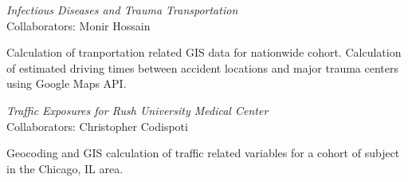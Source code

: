 \documentclass[margin,line]{res}
\newenvironment{list1}{
  \begin{list}{\ding{113}}{%
      \setlength{\itemsep}{0in}
      \setlength{\parsep}{0in} \setlength{\parskip}{0in}
      \setlength{\topsep}{0in} \setlength{\partopsep}{0in} 
      \setlength{\leftmargin}{0.17in}}}{\end{list}}
\begin{document}
\begin{resume}
\textsl{Infectious Diseases and Trauma Transportation} \\
Collaborators:  Monir Hossain\\
\vspace{-0.13in}
\begin{list1}
\item[] Calculation of tranportation related GIS data for nationwide cohort.  Calculation of estimated driving times between accident locations and major trauma centers using Google Maps API.
\end{list1}

\textsl{Traffic Exposures for Rush University Medical Center} \\
Collaborators:  Christopher Codispoti\\
\vspace{-0.13in}
\begin{list1}
\item[] Geocoding and GIS calculation of traffic related variables for a cohort of subject in the Chicago, IL area.
\end{list1}


\end{resume}
\end{document}
